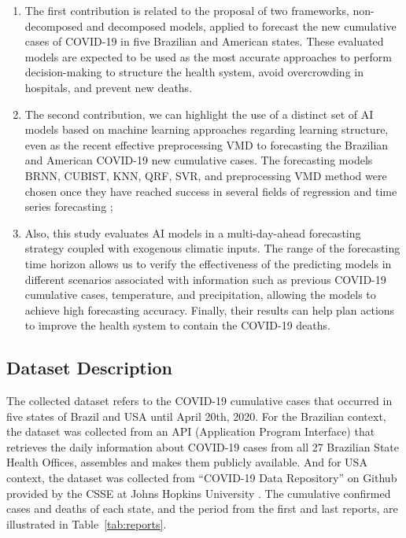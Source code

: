 \begin{enumerate}[label=\alph*)]
    \item The first contribution is related to the proposal of two frameworks, non-decomposed and decomposed models, applied to forecast the new cumulative cases of \ac{COVID-19} in five Brazilian and American states. These evaluated models are expected to be used as the most accurate approaches to perform decision-making to structure the health system, avoid overcrowding in hospitals, and prevent new deaths. 
    
    \item The second contribution, we can highlight the use of a distinct set of \ac{AI} models based on machine learning approaches regarding learning structure, even as the recent effective preprocessing \ac{VMD} to forecasting the Brazilian and American \ac{COVID-19} new cumulative cases. The forecasting models \ac{BRNN}, \ac{CUBIST}, \ac{KNN}, \ac{QRF}, \ac{SVR}, and preprocessing \ac{VMD} method were chosen once they have reached success in several fields of regression and time series forecasting \cite{ribeiro2018Multiobjective,fernandez-delgado2019Extensive,zuo2020Decomposition,zhu2019Hybrid}; 
    
    \item Also, this study evaluates \ac{AI} models in a multi-day-ahead forecasting strategy coupled with exogenous climatic inputs. The range of the forecasting time horizon allows us to verify the effectiveness of the predicting models in different scenarios associated with information such as previous \ac{COVID-19} cumulative cases, temperature, and precipitation, allowing the models to achieve high forecasting accuracy. Finally, their results can help plan actions to improve the health system to contain the \ac{COVID-19} deaths.
\end{enumerate}


\subsection{Dataset Description}

The collected dataset refers to the \ac{COVID-19} cumulative cases that occurred in five states of Brazil and \ac{USA} until April 20th, 2020. For the Brazilian context, the dataset was collected from an API (Application Program Interface) \cite{justen2020COVID19} that retrieves the daily information about \ac{COVID-19} cases from all 27 Brazilian State Health Offices, assembles and makes them publicly available. And for \ac{USA} context, the dataset was collected from ``\ac{COVID-19} Data Repository'' on Github provided by the \ac{CSSE} at Johns Hopkins University \cite{centerforsystemsscienceandengineeringcsse2020Novel}. The cumulative confirmed cases and deaths of each state, and the period from the first and last reports, are illustrated in Table~\ref{tab:reports}. 

